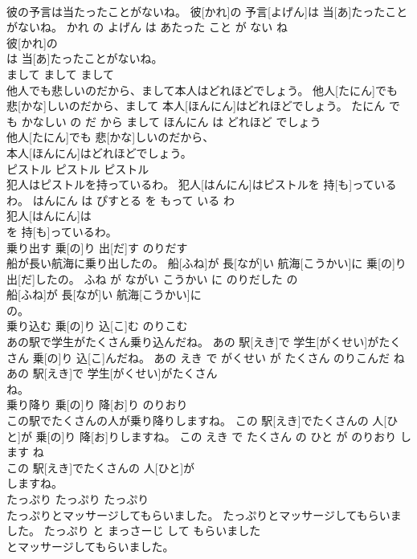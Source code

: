 \documentclass[8pt]{extreport}
\begin{document}
\begin{CJK}{UTF8}{min}
\\	彼の予言は当たったことがないね。	彼[かれ]の 予言[よげん]は 当[あ]たったことがないね。	かれ の よげん は あたった こと が ない ね	
\\	彼[かれ]の
\\	は 当[あ]たったことがないね。			
\\	まして	まして	まして	
\\	他人でも悲しいのだから、まして本人はどれほどでしょう。	他人[たにん]でも 悲[かな]しいのだから、まして 本人[ほんにん]はどれほどでしょう。	たにん で も かなしい の だ から まして ほんにん は どれほど でしょう	
\\	他人[たにん]でも 悲[かな]しいのだから、
\\	本人[ほんにん]はどれほどでしょう。			
\\	ピストル	ピストル	ピストル	
\\	犯人はピストルを持っているわ。	犯人[はんにん]はピストルを 持[も]っているわ。	はんにん は ぴすとる を もって いる わ	
\\	犯人[はんにん]は
\\	を 持[も]っているわ。			
\\	乗り出す	乗[の]り 出[だ]す	のりだす	
\\	船が長い航海に乗り出したの。	船[ふね]が 長[なが]い 航海[こうかい]に 乗[の]り 出[だ]したの。	ふね が ながい こうかい に のりだした の	
\\	船[ふね]が 長[なが]い 航海[こうかい]に
\\	の。			
\\	乗り込む	乗[の]り 込[こ]む	のりこむ	
\\	あの駅で学生がたくさん乗り込んだね。	あの 駅[えき]で 学生[がくせい]がたくさん 乗[の]り 込[こ]んだね。	あの えき で がくせい が たくさん のりこんだ ね	
\\	あの 駅[えき]で 学生[がくせい]がたくさん
\\	ね。			
\\	乗り降り	乗[の]り 降[お]り	のりおり	
\\	この駅でたくさんの人が乗り降りしますね。	この 駅[えき]でたくさんの 人[ひと]が 乗[の]り 降[お]りしますね。	この えき で たくさん の ひと が のりおり します ね	
\\	この 駅[えき]でたくさんの 人[ひと]が
\\	しますね。			
\\	たっぷり	たっぷり	たっぷり	
\\	たっぷりとマッサージしてもらいました。	たっぷりとマッサージしてもらいました。	たっぷり と まっさーじ して もらいました	
\\	とマッサージしてもらいました。			

\end{CJK}
\end{document}
